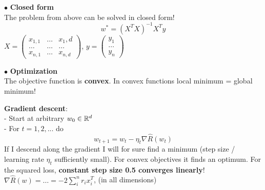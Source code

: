 \documentclass[a4paper, fontsize=8pt, landscape, DIV=1]{scrartcl}
\begin{document}
\begin{multicols*}{4}
		$\bullet$ \textbf{Closed form}\\
		The problem from above can be solved in closed form!
		\begin{equation*}
			w^*=(X^TX)^{-1}X^Ty
		\end{equation*}
		$X=\begin{pmatrix} x_{1,1} & \dots & x_1,d \\ \dots & \dots & \dots \\ x_{n,1} & \dots & x_{n,d} \end{pmatrix}$, $y=\begin{pmatrix} y_1 \\ \dots \\ y_n \end{pmatrix}$\\
		\vspace{0.1cm}
		
		$\bullet$ \textbf{Optimization}\\
		The objective function is \textbf{convex}. In convex functions local minimum = global minimum!
		\vspace{0.1cm}
		
		\textbf{Gradient descent}:\\
		- Start at arbitrary $w_0 \in \mathbb{R}^d$\\
		- For $t=1,2,...$ do
		\begin{equation*}
			w_{t+1}=w_t-\eta_t\nabla\hat{R}(w_t)
		\end{equation*}
		If I descend along the gradient I will for sure find a minimum (step size / learning rate $\eta_t$ sufficiently small). For convex objectives it finds an optimum. For the squared loss, \textbf{constant step size 0.5 converges linearly}!\\
		$\nabla\hat{R}(w)=\dots=-2\sum_{i}^{n}r_ix_i^T$, (in all dimensions)
		\vspace{0.1cm}
		

\end{multicols*}
\end{document}
